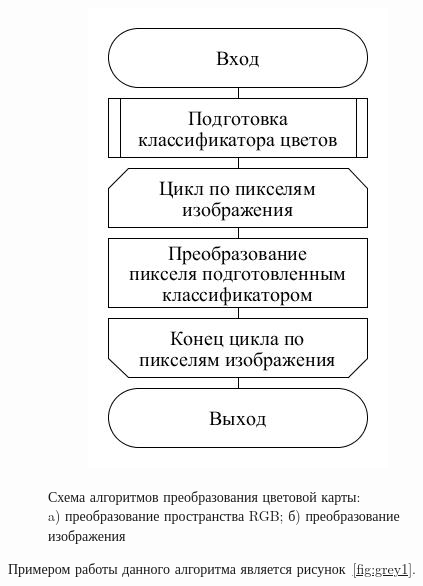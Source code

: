 \documentclass[14pt, a4paper]{extreport}
\begin{document}
\begin{figure}[h!]
\begin{subfigure}{.31\textwidth}
			\includegraphics[width = \textwidth]{image/chapter_2/colorclassification2}
			\caption{}
		\end{subfigure}
		\centering
		\caption{Схема алгоритмов преобразования цветовой карты: \\a) преобразование пространства RGB; б) преобразование изображения}
		\label{fig:colorclassification}
	\end{figure}
	Примером работы данного алгоритма является рисунок~\ref{fig:grey1}.
\end{document}
